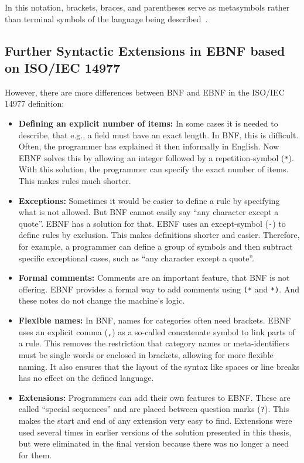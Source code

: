 In this notation, brackets, braces, and parentheses serve as metasymbols rather than terminal symbols of the language being described~\cite[pp.~149-151]{SebestaConceptsEdition}.

\subsection{Further Syntactic Extensions in EBNF based on ISO/IEC 14977}

However, there are more differences between BNF and EBNF in the ISO/IEC 14977 definition:~\cite[p.~VII]{ISO/IEC149771996InformationBNF}

\begin{itemize}
    \item \textbf{Defining an explicit number of items:} In some cases it is needed to describe, that e.g., a field must have an exact length. In BNF, this is difficult. Often, the programmer has explained it then informally in English. Now EBNF solves this by allowing an integer followed by a repetition-symbol (\texttt{*}). With this solution, the programmer can specify the exact number of items. This makes rules much shorter.
    
    \item \textbf{Exceptions:} Sometimes it would be easier to define a rule by specifying what is not allowed. But BNF cannot easily say ``any character except a quote''. EBNF has a solution for that. EBNF uses an except-symbol (\texttt{-}) to define rules by exclusion. This makes definitions shorter and easier. Therefore, for example, a programmer can define a group of symbols and then subtract specific exceptional cases, such as ``any character except a quote''.
    
    \item \textbf{Formal comments:} Comments are an important feature, that BNF is not offering. EBNF provides a formal way to add comments using \texttt{(*} and \texttt{*)}. And these notes do not change the machine's logic.
    
    \item \textbf{Flexible names:} In BNF, names for categories often need brackets. EBNF uses an explicit comma (\texttt{,}) as a so-called concatenate symbol to link parts of a rule. This removes the restriction that category names or meta-identifiers must be single words or enclosed in brackets, allowing for more flexible naming. It also ensures that the layout of the syntax like spaces or line breaks has no effect on the defined language.
    
    \item \textbf{Extensions:} Programmers can add their own features to EBNF. These are called ``special sequences'' and are placed between question marks (\texttt{?}). This makes the start and end of any extension very easy to find. Extensions were used several times in earlier versions of the solution presented in this thesis, but were eliminated in the final version because there was no longer a need for them.
\end{itemize}

